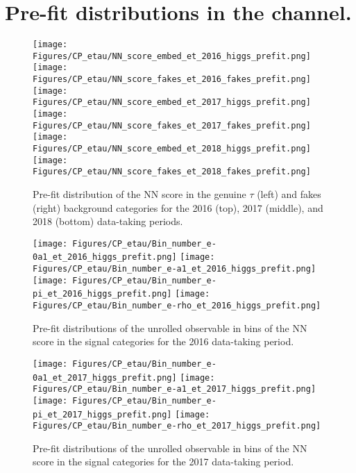 \newpage
\section{Pre-fit distributions in the \et channel.}\label{app:pre-fit}

\begin{figure}[H]
    \centering
    \texttt{[image: Figures/CP\_etau/NN\_score\_embed\_et\_2016\_higgs\_prefit.png]}
    \texttt{[image: Figures/CP\_etau/NN\_score\_fakes\_et\_2016\_fakes\_prefit.png]}
    \texttt{[image: Figures/CP\_etau/NN\_score\_embed\_et\_2017\_higgs\_prefit.png]}
    \texttt{[image: Figures/CP\_etau/NN\_score\_fakes\_et\_2017\_fakes\_prefit.png]}
    \texttt{[image: Figures/CP\_etau/NN\_score\_embed\_et\_2018\_higgs\_prefit.png]}
    \texttt{[image: Figures/CP\_etau/NN\_score\_fakes\_et\_2018\_fakes\_prefit.png]}
    \caption{Pre-fit distribution of the NN score in the genuine $\tau$ (left) and fakes (right) background categories for the 2016 (top), 2017 (middle), and 2018 (bottom) data-taking periods.}
\end{figure}

\begin{figure}[H]
    \centering
    \texttt{[image: Figures/CP\_etau/Bin\_number\_e-0a1\_et\_2016\_higgs\_prefit.png]}
    \texttt{[image: Figures/CP\_etau/Bin\_number\_e-a1\_et\_2016\_higgs\_prefit.png]}
    \texttt{[image: Figures/CP\_etau/Bin\_number\_e-pi\_et\_2016\_higgs\_prefit.png]}
    \texttt{[image: Figures/CP\_etau/Bin\_number\_e-rho\_et\_2016\_higgs\_prefit.png]}
    \caption{Pre-fit distributions of the unrolled \phicp observable in bins of the NN score in the signal categories for the 2016 data-taking period.}
\end{figure}

\begin{figure}[H]
    \centering
    \texttt{[image: Figures/CP\_etau/Bin\_number\_e-0a1\_et\_2017\_higgs\_prefit.png]}
    \texttt{[image: Figures/CP\_etau/Bin\_number\_e-a1\_et\_2017\_higgs\_prefit.png]}
    \texttt{[image: Figures/CP\_etau/Bin\_number\_e-pi\_et\_2017\_higgs\_prefit.png]}
    \texttt{[image: Figures/CP\_etau/Bin\_number\_e-rho\_et\_2017\_higgs\_prefit.png]}
    \caption{Pre-fit distributions of the unrolled \phicp observable in bins of the NN score in the signal categories for the 2017 data-taking period.}
\end{figure}

